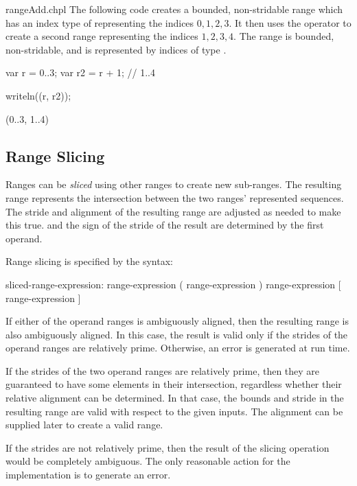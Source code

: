 \begin{chapelexample}{rangeAdd.chpl}
The following code creates a bounded, non-stridable range 
which has an index type of  representing the indices ${0, 1, 2, 3}$.  
It then uses the \chpl{+} operator to create a second range 
representing the indices ${1, 2, 3, 4}$.  The  range is bounded,
non-stridable, and is represented by indices of type .
\begin{chapel}
var r = 0..3;
var r2 = r + 1;    // 1..4
\end{chapel}
\begin{chapelpost}
writeln((r, r2));
\end{chapelpost}
\begin{chapeloutput}
(0..3, 1..4)
\end{chapeloutput}
\end{chapelexample}


\subsection{Range Slicing}
\label{Range_Slicing}

Ranges can be \emph{sliced} using other ranges to create new
sub-ranges.  The resulting range represents the intersection between
the two ranges' represented sequences.  The stride and alignment of the resulting range are adjusted as
needed to make this true.
 and the sign of the stride of the result are determined
by the first operand.

Range slicing is specified by the syntax:
\begin{syntax}
sliced-range-expression:
  range-expression ( range-expression )
  range-expression [ range-expression ]
\end{syntax}

If either of the operand ranges is ambiguously aligned, then the resulting range
is also ambiguously aligned.  In this case, the result is valid only if the
strides of the operand ranges are relatively prime.  Otherwise, an error is
generated at run time.

\begin{rationale}
If the strides of the two operand ranges are relatively prime, then they are
guaranteed to have some elements in their intersection, regardless whether their
relative alignment can be determined.  In that case, the bounds and stride in the resulting
range are valid with respect to the given inputs.
The alignment can be supplied later to create a valid range.

If the strides are not relatively prime, then the result of the slicing
operation would be completely ambiguous.  The only reasonable action for the
implementation is to generate an error.
\end{rationale}

